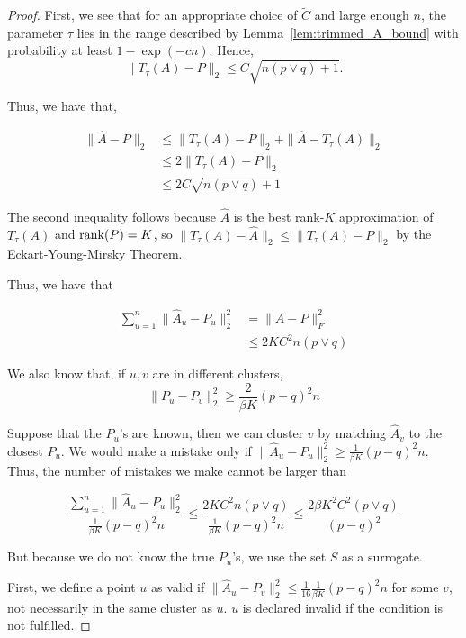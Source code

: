 \begin{proof}

First, we see that for an appropriate choice of $\tilde{C}$ and large enough $n$, the parameter $\tau$ lies in the range described by Lemma~\ref{lem:trimmed_A_bound} with probability at least $1- \exp(-cn)$. Hence,
\begin{equation*}
\| T_{\tau}(A) - P \|_2 \leq C \sqrt{ n (p \vee q) + 1}.
\end{equation*}

Thus, we have that,

\begin{align*}
\| \hat{A} - P \|_2 &\leq \| T_\tau(A)  - P \|_2 + \| \hat{A} - T_\tau(A) \|_2 \\
   &\leq 2\| T_\tau(A) - P \|_2 \\
  &\leq 2C \sqrt{ n (p \vee q) + 1} 
\end{align*}

The second inequality follows because $\hat{A}$ is the best rank-$K$ approximation of $T_\tau (A)$ and $\mathop{\rm rank}(P) = K$, so $\|T_\tau(A) - \hat{A}\|_2 \le \|T_\tau(A) - P\|_2$ by the Eckart-Young-Mirsky Theorem.

Thus, we have that

\begin{align*}
\sum_{u=1}^n \| \hat{A}_u - P_u \|_2^2 &= \| \hat{A} - P \|_F^2 \\
       &\leq 2 K C^2 n (p \vee q)
\end{align*}

We also know that, if $u, v$ are in different clusters, 
\[
\| P_u - P_v \|_2^2 \geq \frac{2}{\beta K} (p - q)^2 n 
\]


Suppose that the $P_u$'s are known, then we can cluster $v$ by matching $\hat{A}_v$ to the closest $P_u$. We would make a mistake only if $\| \hat{A}_u - P_u \|_2^2 \geq \frac{1}{\beta K} (p-q)^2 n$. Thus, the number of mistakes we make cannot be larger than

\[
\frac{\sum_{u=1}^n \| \hat{A}_u - P_u \|_2^2}{ \frac{1}{\beta K} (p-q)^2 n } \leq \frac{ 2 K C^2 n (p \vee q)}{ \frac{1}{\beta K} (p-q)^2 n} \leq \frac{2 \beta K^2 C^2 (p \vee q)}{(p-q)^2} 
\]


But because we do not know the true $P_u$'s, we use the set $S$ as a surrogate. 

First, we define a point $u$ as valid if $\| \hat{A}_u - P_v \|_2^2 \leq \frac{1}{16} \frac{1}{\beta K} (p-q)^2 n$ for some $v$, not necessarily in the same cluster as $u$. $u$ is declared invalid if the condition is not fulfilled. 


\end{proof}
